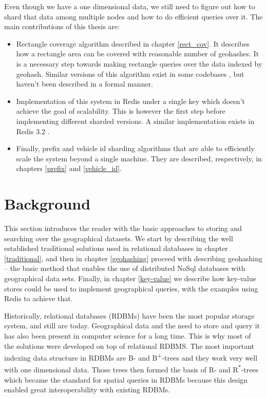 \documentclass[times, utf8, diplomski]{fer}
\newcommand{\bplus}{B\textsuperscript{+}}
\newcommand{\rstar}{R\textsuperscript{*}}
\begin{document}
Even though we have a one dimensional data, we still need to figure out how to shard that data among multiple nodes and how to do efficient queries over it. The main contributions of this thesis are:
\begin{itemize}
\item Rectangle coverage algorithm described in chapter \ref{rect_cov}. It describes how a rectangle area can be covered with reasonable number of geohashes. It is a necessary step towards making rectangle queries over the data indexed by geohash. Similar versions of this algorithm exist in some codebases \citet{davidmoten}, but haven't been described in a formal manner.

\item Implementation of this system in Redis under a single key which doesn't achieve the goal of scalability. This is however the first step before implementing different sharded versions. A similar implementation exists in Redis 3.2 \cite{redis_geo}.

\item Finally, prefix and vehicle id sharding algorithms that are able to efficiently scale the system beyond a single machine. They are described, respectively, in chapters \ref{prefix} and \ref{vehicle_id}.
\end{itemize} 

\chapter{Background}
This section introduces the reader with the basic approaches to storing and searching over the geographical datasets. We start by describing the well established traditional solutions used in relational databases in chapter \ref{traditional}, and then in chapter \ref{geohashing} proceed with describing geohashing -- the basic method that enables the use of distributed NoSql databases with geographical data sets. Finally, in chapter \ref{key-value} we describe how key-value stores could be used to implement geographical queries, with the examples using Redis to achieve that.

Historically, relational databases (RDBMs) have been the most popular storage system, and still are today. Geographical data and the need to store and query it has also been present in computer science for a long time. This is why most of the solutions were developed on top of relational RDBMS. The most important indexing data structure in RDBMs are B- and \bplus-trees and they work very well with one dimensional data. Those trees then formed the basis of R- and \rstar-trees which became the standard for spatial queries in RDBMs because this design enabled great interoperability with existing RDBMs.
\end{document}
